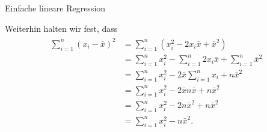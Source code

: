 \documentclass[
  8pt,
  ignorenonframetext,
]{beamer}
\begin{document}
\begin{frame}{Einfache lineare Regression}
\protect\hypertarget{einfache-lineare-regression-3}{}
\footnotesize

Weiterhin halten wir fest, dass \tiny \begin{align}
\begin{split}
\sum_{i=1}^n (x_i - \bar{x})^2
& = \sum_{i=1}^n (x_i^2 - 2x_i\bar{x}  + \bar{x}^2) \\
& = \sum_{i=1}^n x_i^2 - \sum_{i=1}^n 2x_i\bar{x}  + \sum_{i=1}^n \bar{x}^2 \\
& = \sum_{i=1}^n x_i^2 - 2\bar{x}\sum_{i=1}^n x_i  + n\bar{x}^2 \\
& = \sum_{i=1}^n x_i^2 - 2\bar{x}n\bar{x}  + n\bar{x}^2 \\
& = \sum_{i=1}^n x_i^2 - 2n\bar{x}^2 + n\bar{x}^2 \\
& = \sum_{i=1}^n x_i^2 - n\bar{x}^2. 
\end{split}
\end{align}
\end{frame}
\end{document}
